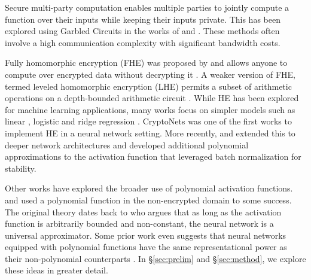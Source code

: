 \documentclass[conference]{IEEEtran}
\begin{document}
Secure multi-party computation enables multiple parties to jointly compute a function over their inputs while keeping their inputs private.
This has been explored using Garbled Circuits \cite{yao1986generate} in the works of \cite{rouhani2017deepsecure, kolesnikov2008improved} and \cite{mohassel2017secureml}.
These methods often involve a high communication complexity with significant bandwidth costs. %

Fully homomorphic encryption (FHE) was proposed by \cite{gentry2009fully} and allows anyone to compute over encrypted data without decrypting it \cite{naehrig2011can}.
A weaker version of FHE, termed leveled homomorphic encryption (LHE) permits a subset of arithmetic operations on a depth-bounded arithmetic circuit \cite{brakerski2014efficient}.
While HE has been explored for machine learning applications, many works focus on simpler models such as linear \cite{hall2011secure}, logistic \cite{cheon2017privacy} and ridge regression \cite{irene2017ridge}.
CryptoNets \cite{gilad2016cryptonets} was one of the first works to implement HE in a neural network setting.
More recently, \cite{chabanne2017privacy} and \cite{hesamifard2017cryptodl} extended this to deeper network architectures and developed additional polynomial approximations to the activation function that leveraged batch normalization for stability.

Other works have explored the broader use of polynomial activation functions.
\cite{piazza1992artificial} and \cite{ma2005constructive} used a polynomial function in the non-encrypted domain to some success.
The original theory dates back to \cite{hornik1991approximation} who argues that as long as the activation function is arbitrarily bounded and non-constant, the neural network is a universal approximator.
Some prior work even suggests that neural networks equipped with polynomial functions have the same representational power as their non-polynomial counterparts \cite{gautier2016globally, livni2014computational}.
In \S\ref{sec:prelim} and \S\ref{sec:method}, we explore these ideas in greater detail.
\end{document}
